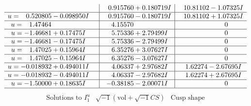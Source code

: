 \documentclass[1p]{elsarticle_modified}
\theoremstyle{definition}
\newcommand{\I}{\sqrt{-1}}
\begin{document}
$$\begin{array}{c|c|c}
 & \phantom{-}0.915760 + 0.180719 I & \phantom{-}10.81102 - 1.07325 I \\ \hline\begin{aligned}
u &= \phantom{-}0.520805 - 0.098950 I\end{aligned}
 & \phantom{-}0.915760 - 0.180719 I & \phantom{-}10.81102 + 1.07325 I \\ \hline\begin{aligned}
u &= \phantom{-}1.47464\phantom{ +0.000000I}\end{aligned}
 & \phantom{-}4.15570\phantom{ +0.000000I} & \phantom{-0.000000 } 0 \\ \hline\begin{aligned}
u &= -1.46681 + 0.17475 I\end{aligned}
 & \phantom{-}5.75336 + 2.79499 I & \phantom{-0.000000 } 0 \\ \hline\begin{aligned}
u &= -1.46681 - 0.17475 I\end{aligned}
 & \phantom{-}5.75336 - 2.79499 I & \phantom{-0.000000 } 0 \\ \hline\begin{aligned}
u &= \phantom{-}1.47025 + 0.15964 I\end{aligned}
 & \phantom{-}6.35276 + 3.07627 I & \phantom{-0.000000 } 0 \\ \hline\begin{aligned}
u &= \phantom{-}1.47025 - 0.15964 I\end{aligned}
 & \phantom{-}6.35276 - 3.07627 I & \phantom{-0.000000 } 0 \\ \hline\begin{aligned}
u &= -0.018932 + 0.494011 I\end{aligned}
 & \phantom{-}4.06337 + 2.97682 I & \phantom{-}1.62274 - 2.67695 I \\ \hline\begin{aligned}
u &= -0.018932 - 0.494011 I\end{aligned}
 & \phantom{-}4.06337 - 2.97682 I & \phantom{-}1.62274 + 2.67695 I \\ \hline\begin{aligned}
u &= -1.50000 + 0.18635 I\end{aligned}
 & -0.38185 - 2.00071 I & \phantom{-0.000000 } 0\\
 \hline 
 \end{array}$$\newpage$$\begin{array}{c|c|c}  
\text{Solutions to }I^u_{1}& \I (\text{vol} + \sqrt{-1}CS) & \text{Cusp shape}\\

\end{array}$$
\end{document}
